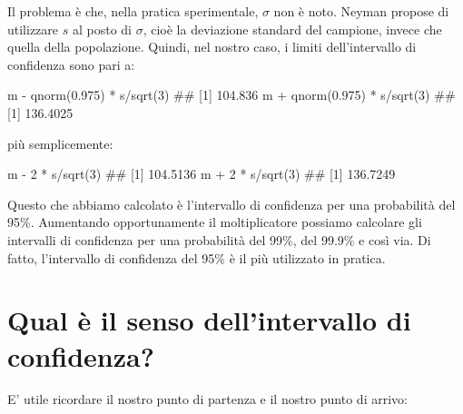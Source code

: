 \documentclass[a4paper,12pt,oneside]{book}
\newenvironment{Shaded}{\begin{snugshade}}{\end{snugshade}}
\newcommand{\DecValTok}[1]{#1}
\newcommand{\FloatTok}[1]{#1}
\newcommand{\SpecialCharTok}[1]{#1}
\newcommand{\DocumentationTok}[1]{#1}
\newcommand{\FunctionTok}[1]{#1}
\newcommand{\NormalTok}[1]{#1}
\begin{document}
Il problema è che, nella pratica sperimentale, \(\sigma\) non è noto. Neyman propose di utilizzare \(s\) al posto di \(\sigma\), cioè la deviazione standard del campione, invece che quella della popolazione. Quindi, nel nostro caso, i limiti dell'intervallo di confidenza sono pari a:

\begin{Shaded}
\begin{Highlighting}[]
\NormalTok{m }\SpecialCharTok{{-}} \FunctionTok{qnorm}\NormalTok{(}\FloatTok{0.975}\NormalTok{) }\SpecialCharTok{*}\NormalTok{ s}\SpecialCharTok{/}\FunctionTok{sqrt}\NormalTok{(}\DecValTok{3}\NormalTok{)}
\DocumentationTok{\#\# [1] 104.836}
\NormalTok{m }\SpecialCharTok{+} \FunctionTok{qnorm}\NormalTok{(}\FloatTok{0.975}\NormalTok{) }\SpecialCharTok{*}\NormalTok{ s}\SpecialCharTok{/}\FunctionTok{sqrt}\NormalTok{(}\DecValTok{3}\NormalTok{)}
\DocumentationTok{\#\# [1] 136.4025}
\end{Highlighting}
\end{Shaded}

più semplicemente:

\begin{Shaded}
\begin{Highlighting}[]
\NormalTok{m }\SpecialCharTok{{-}} \DecValTok{2} \SpecialCharTok{*}\NormalTok{ s}\SpecialCharTok{/}\FunctionTok{sqrt}\NormalTok{(}\DecValTok{3}\NormalTok{)}
\DocumentationTok{\#\# [1] 104.5136}
\NormalTok{m }\SpecialCharTok{+} \DecValTok{2} \SpecialCharTok{*}\NormalTok{ s}\SpecialCharTok{/}\FunctionTok{sqrt}\NormalTok{(}\DecValTok{3}\NormalTok{)}
\DocumentationTok{\#\# [1] 136.7249}
\end{Highlighting}
\end{Shaded}

Questo che abbiamo calcolato è l'intervallo di confidenza per una probabilità del 95\%. Aumentando opportunamente il moltiplicatore possiamo calcolare gli intervalli di confidenza per una probabilità del 99\%, del 99.9\% e così via. Di fatto, l'intervallo di confidenza del 95\% è il più utilizzato in pratica.

\hypertarget{qual-uxe8-il-senso-dellintervallo-di-confidenza}{%
\section{Qual è il senso dell'intervallo di confidenza?}\label{qual-uxe8-il-senso-dellintervallo-di-confidenza}}

E' utile ricordare il nostro punto di partenza e il nostro punto di arrivo:
\end{document}

